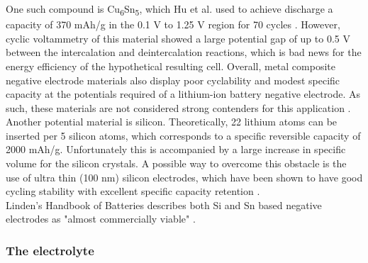 \documentclass[12pt]{article} %
\begin{document}
One such compound is Cu\textsubscript{6}Sn\textsubscript{5}, which Hu et al. used to achieve discharge a capacity of 370 mAh/g in the 0.1 V to 1.25 V region for 70 cycles \cite{hu_cyclic_2009}.
However, cyclic voltammetry of this material showed a large potential gap of up to 0.5 V between the intercalation and deintercalation reactions, which is bad news for the energy efficiency of the hypothetical resulting cell.
Overall, metal composite negative electrode materials also display poor cyclability and modest specific capacity at the potentials required of a lithium-ion battery negative electrode.
As such, these materials are not considered strong contenders for this application \cite{kulova_new_2013}.
\\
Another potential material is silicon.
Theoretically, 22 lithium atoms can be inserted per 5 silicon atoms, which corresponds to a specific reversible capacity of 2000 mAh/g.
Unfortunately this is accompanied by a large increase in specific volume for the silicon crystals.
A possible way to overcome this obstacle is the use of ultra thin (\mytilde{}100 nm) silicon electrodes, which have been shown to have good cycling stability with excellent specific capacity retention \cite{kulova_new_2013}.
\\
Linden's Handbook of Batteries describes both Si and Sn based negative electrodes as "almost commercially viable" \cite{reddy_thomas_section_2011-2}.


\subsubsection{The electrolyte} %
\end{document}

